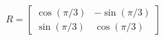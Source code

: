 \documentclass[preview]{standalone}
\begin{document}
\begin{align*}
R = \begin{bmatrix} \cos(\pi/3) & -\sin(\pi/3) \\ \sin(\pi/3) & \cos(\pi/3) \end{bmatrix}
\end{align*}
\end{document}
